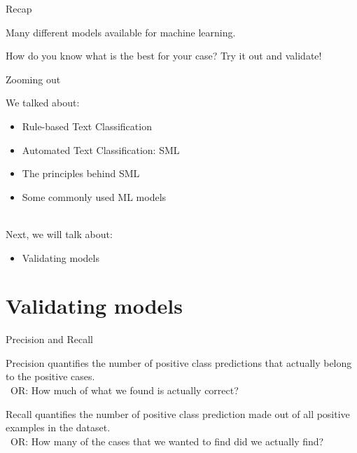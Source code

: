 \documentclass[handout]{beamer}
\begin{document}
\begin{frame}{Recap}
	
	Many different models available for machine learning.
	
	How do you know what is the best for your case? Try it out and validate!
	
\end{frame}



\begin{frame}{Zooming out} 
	
	We talked about:
	\begin{itemize}
		\item Rule-based Text Classification
		\item Automated Text Classification: SML
		\item The principles behind SML
		\item Some commonly used ML models \\\
	\end{itemize}
	
	Next, we will talk about:
	\begin{itemize}
		\item Validating models
	\end{itemize}
	
\end{frame}


\section{Validating models}


\begin{frame}{Precision and Recall}
	
	Precision quantifies the number of positive class predictions that actually belong to the positive cases. \\\ 
	OR: How much of what we found is actually correct?
	
	Recall quantifies the number of positive class prediction made out of all positive examples in the dataset. \\\
	OR: How many of the cases that we wanted to find did we actually find?
	
	
	
	
\end{frame}
\end{document}
